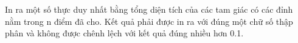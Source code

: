 In ra một số thực duy nhất bằng tổng diện tích của các tam giác có các đỉnh nằm trong n điểm đã cho. Kết quả phải được in ra với đúng một chữ số thập phân và không được chênh lệch với kết quả đúng nhiều hơn 0.1.  

\